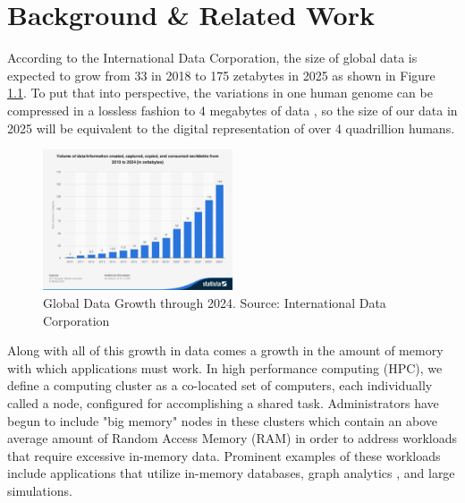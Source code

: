 \chapter{Background \& Related Work}

According to the International Data Corporation, the size of global data is expected to grow from 33 in 2018 to 175 zetabytes in 2025 as shown in Figure \ref{fig:data_growth}. \cite{IDS} To put that into perspective, the variations in one human genome can be compressed in a lossless fashion to 4 megabytes of data \cite{genome_size}, so the size of our data in 2025 will be equivalent to the digital representation of over 4 quadrillion humans. 

\begin{figure}[h]
\centering
\includegraphics[width=0.5\textwidth]{Figures/global_data_growth.jpg}
\caption{Global Data Growth through 2024. Source: International Data Corporation}
\label{fig:data_growth}
\end{figure}

Along with all of this growth in data comes a growth in the amount of memory with which applications must work. In high performance computing (HPC), we define a computing cluster as a co-located set of computers, each individually called a node, configured for accomplishing a shared task.  Administrators have begun to include "big memory" nodes in these clusters which contain an above average amount of Random Access Memory (RAM) in order to address workloads that require excessive in-memory data. Prominent examples of these workloads include applications that utilize in-memory databases, graph analytics \cite{virtual_memory_tlb}, and large simulations. 

